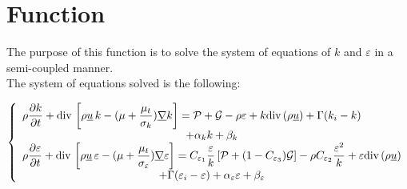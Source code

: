 
%
%
%
%


\label{ap:turbke}

\hypertarget{cs\_turbulence\_ke}{}

\vspace{1cm}
\section*{Function}
The purpose of this function is to solve the system of equations of
$k$ and $\varepsilon$ in a semi-coupled manner.\\
The system of equations solved is the following:

\begin{equation}
\left\{\begin{array}{l}
\displaystyle
\rho\frac{\partial k}{\partial t} +
\dive\left[\rho \vect{u}\,k-(\mu+\frac{\mu_t}{\sigma_k})\grad{k}\right] =
\mathcal{P}+\mathcal{G}-\rho\varepsilon+k\dive(\rho\vect{u})
+\Gamma(k_i-k)\\
\multicolumn{1}{c}{+\alpha_k k +\beta_k}\\
\displaystyle
\rho\frac{\partial \varepsilon}{\partial t} +
\dive\left[\rho \vect{u}\,\varepsilon-
(\mu+\frac{\mu_t}{\sigma_\varepsilon})\grad{\varepsilon}\right] =
C_{\varepsilon_1}\frac{\varepsilon}{k}\left[\mathcal{P}
+(1-C_{\varepsilon_3})\mathcal{G}\right]
-\rho C_{\varepsilon_2}\frac{\varepsilon^2}{k}
+\varepsilon\dive(\rho\vect{u})\\
\multicolumn{1}{c}{+\Gamma(\varepsilon_i-\varepsilon)
+\alpha_\varepsilon \varepsilon +\beta_\varepsilon}
\end{array}\right.
\end{equation}

